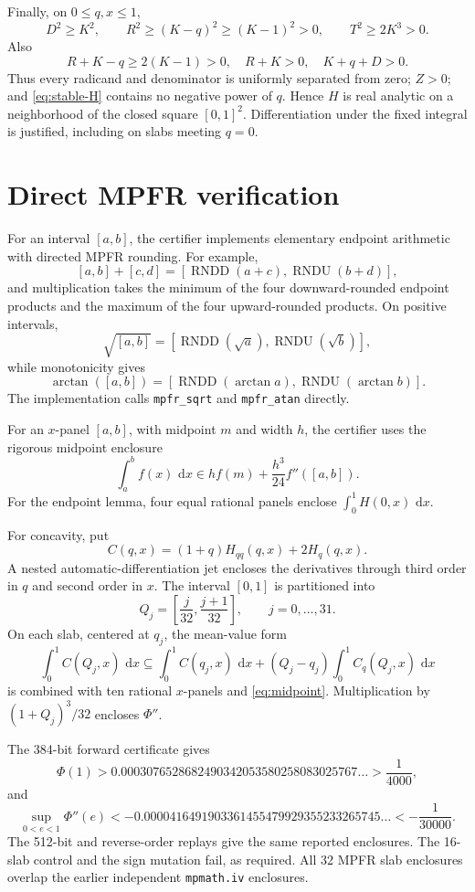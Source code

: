 \documentclass[11pt]{article}
\numberwithin{equation}{section}
\theoremstyle{remark}
\newcommand{\dd}{\,\mathrm d}
\begin{document}
Finally, on \(0\le q,x\le1\),
\[
  D^2\ge K^2,
  \qquad
  R^2\ge(K-q)^2\ge(K-1)^2>0,
  \qquad
  T^2\ge2K^3>0.
\]
Also
\[
  R+K-q\ge2(K-1)>0,
  \quad R+K>0,
  \quad K+q+D>0.
\]
Thus every radicand and denominator is uniformly separated from zero; \(Z>0\); and \eqref{eq:stable-H} contains no negative power of \(q\).  Hence \(H\) is real analytic on a neighborhood of the closed square \([0,1]^2\).  Differentiation under the fixed integral is justified, including on slabs meeting \(q=0\).

\section{Direct MPFR verification}
\label{app:mpfr}

For an interval \([a,b]\), the certifier implements elementary endpoint arithmetic with directed MPFR rounding.  For example,
\[
[a,b]+[c,d]
=[\operatorname{RNDD}(a+c),\operatorname{RNDU}(b+d)],
\]
and multiplication takes the minimum of the four downward-rounded endpoint products and the maximum of the four upward-rounded products.  On positive intervals,
\[
  \sqrt{[a,b]}
  =[\operatorname{RNDD}(\sqrt a),\operatorname{RNDU}(\sqrt b)],
\]
while monotonicity gives
\[
  \arctan([a,b])
  =[\operatorname{RNDD}(\arctan a),\operatorname{RNDU}(\arctan b)].
\]
The implementation calls \texttt{mpfr\_sqrt} and \texttt{mpfr\_atan} directly.

For an \(x\)-panel \([a,b]\), with midpoint \(m\) and width \(h\), the certifier uses the rigorous midpoint enclosure
\begin{equation}
  \int_a^bf(x)\,\dd x
  \in h f(m)+\frac{h^3}{24}f''([a,b]).
  \label{eq:midpoint}
\end{equation}
For the endpoint lemma, four equal rational panels enclose \(\int_0^1H(0,x)\,\dd x\).

For concavity, put
\[
  C(q,x)=(1+q)H_{qq}(q,x)+2H_q(q,x).
\]
A nested automatic-differentiation jet encloses the derivatives through third order in \(q\) and second order in \(x\).  The interval \([0,1]\) is partitioned into
\[
  Q_j=\left[\frac j{32},\frac{j+1}{32}\right],
  \qquad j=0,\ldots,31.
\]
On each slab, centered at \(q_j\), the mean-value form
\[
  \int_0^1C(Q_j,x)\,\dd x
  \subseteq
  \int_0^1C(q_j,x)\,\dd x
  +(Q_j-q_j)\int_0^1C_q(Q_j,x)\,\dd x
\]
is combined with ten rational \(x\)-panels and \eqref{eq:midpoint}.  Multiplication by \((1+Q_j)^3/32\) encloses \(\Phi''\).

The 384-bit forward certificate gives
\[
  \Phi(1)>
  0.0003076528682490342053580258083025767\ldots
  >\frac1{4000},
\]
and
\[
  \sup_{0<e<1}\Phi''(e)
  <-0.0000416491903361455479929355233265745\ldots
  <-\frac1{30000}.
\]
The 512-bit and reverse-order replays give the same reported enclosures.  The 16-slab control and the sign mutation fail, as required.  All 32 MPFR slab enclosures overlap the earlier independent \texttt{mpmath.iv} enclosures.
\end{document}
